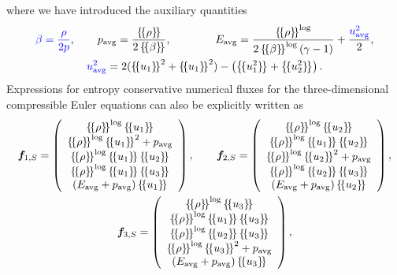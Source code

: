 \documentclass[review,onefignum,onetabnum,final]{siamart171218}
\newcommand{\nor}[1]{\left\| #1 \right\|}
\newcommand{\LRp}[1]{\left( #1 \right)}
\newcommand{\LRc}[1]{\left\{ #1 \right\}}
\newcommand{\avg}[1] {\ensuremath{\LRc{\!\{#1\}\!}}}
\newcommand{\note}[1]{{\color{blue}{#1}}}
\begin{document}
where we have introduced the auxiliary quantities 
\begin{gather}
\note{\beta = \frac{\rho}{2p}}, \qquad p_{\rm avg} = \frac{\avg{\rho}}{2\avg{\beta}}, \qquad \qquad E_{\rm avg} = \frac{\avg{\rho}^{\log}}{2\avg{\beta}^{\log}\LRp{\gamma -1}}   + \frac{\note{u_{\rm avg}^2}}{2}, \label{eq:fluxaux} \\
\note{u^2_{\rm avg}} = 2(\avg{u_1}^2 + \avg{u_1}^2) - \LRp{\avg{u_1^2} +\avg{u_2^2}} \nonumber.  
\end{gather}
Expressions for entropy conservative numerical fluxes for the three-dimensional compressible Euler equations can also be explicitly written as
\begin{gather*}
\bm{f}_{1,S} = \LRp{\begin{array}{c}
\avg{\rho}^{\log}\avg{u_1}\\
\avg{\rho}^{\log}\avg{u_1}^2 + p_{\rm avg}\\
\avg{\rho}^{\log}\avg{u_1}\avg{u_2}\\
\avg{\rho}^{\log}\avg{u_1}\avg{u_3}\\
(E_{\rm avg}+ p_{\rm avg})\avg{u_1}\\
\end{array}}, 
\qquad 
\bm{f}_{2,S} = \LRp{\begin{array}{c}
\avg{\rho}^{\log}\avg{u_2}\\
\avg{\rho}^{\log}\avg{u_1}\avg{u_2}\\
\avg{\rho}^{\log}\avg{u_2}^2 + p_{\rm avg}\\
\avg{\rho}^{\log}\avg{u_2}\avg{u_3}\\
(E_{\rm avg}+ p_{\rm avg})\avg{u_2}\\
\end{array}},\\
\bm{f}_{3,S} = \LRp{\begin{array}{c}
\avg{\rho}^{\log}\avg{u_3}\\
\avg{\rho}^{\log}\avg{u_1}\avg{u_3}\\
\avg{\rho}^{\log}\avg{u_2}\avg{u_3}\\
\avg{\rho}^{\log}\avg{u_3}^2 + p_{\rm avg}\\
(E_{\rm avg}+ p_{\rm avg})\avg{u_3}\\
\end{array}},\nonumber
\end{gather*}
\end{document}
